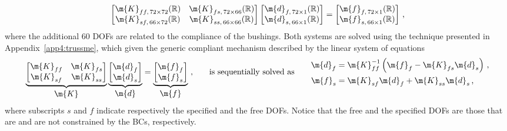 \begin{equation}
  \begin{bmatrix}
    \m{K}_{ff ,\, 72 \times 72}(\mathbb{R}) & \m{K}_{fs ,\, 72 \times 66}(\mathbb{R}) \\
    \m{K}_{sf ,\, 66 \times 72}(\mathbb{R}) & \m{K}_{ss ,\, 66 \times 66}(\mathbb{R})
  \end{bmatrix} \begin{bmatrix}
    \m{d}_{f ,\, 72 \times 1}(\mathbb{R}) \\ \m{d}_{s ,\, 66 \times 1}(\mathbb{R})
  \end{bmatrix} = \begin{bmatrix}
    \m{f}_{f ,\, 72 \times 1}(\mathbb{R}) \\ \m{f}_{s ,\, 66 \times 1}(\mathbb{R})
  \end{bmatrix}
  \, \text{,}
\end{equation}
%
where the additional 60 \acp{DOF} are related to the compliance of the bushings. Both systems are solved using the technique presented in Appendix~\ref{app4:trussme}, which given the generic compliant mechanism described by the linear system of equations
%
\begin{equation}
  \label{chap4:eq:macrofe}
  \underbrace{\begin{bmatrix}
    \m{K}_{ff} & \m{K}_{fs} \\
    \m{K}_{sf} & \m{K}_{ss}
  \end{bmatrix}}_{\textstyle\m{K}} \underbrace{\begin{bmatrix}
    \m{d}_{f} \\ \m{d}_{s}
  \end{bmatrix}}_{\textstyle\m{d}} = \underbrace{\begin{bmatrix}
    \m{f}_{f} \\ \m{f}_{s}
  \end{bmatrix}}_{\textstyle\m{f}} \, \text{,}
  \qquad \text{is sequentially solved as} \qquad
  \begin{aligned}
    \m{d}_{f} &= \m{K}_{ff}^{-1}\left(\m{f}_{f} - \m{K}_{fs}\m{d}_{s}\right) \, \text{,} \\
    \m{f}_{s} &= \m{K}_{sf}\m{d}_{f} + \m{K}_{ss}\m{d}_{s} \, \text{,}
  \end{aligned}
\end{equation}
%
where subscripts $s$ and $f$ indicate respectively the specified and the free \acp{DOF}. Notice that the free and the specified \acp{DOF} are those that are and are not constrained by the \acp{BC}, respectively.

